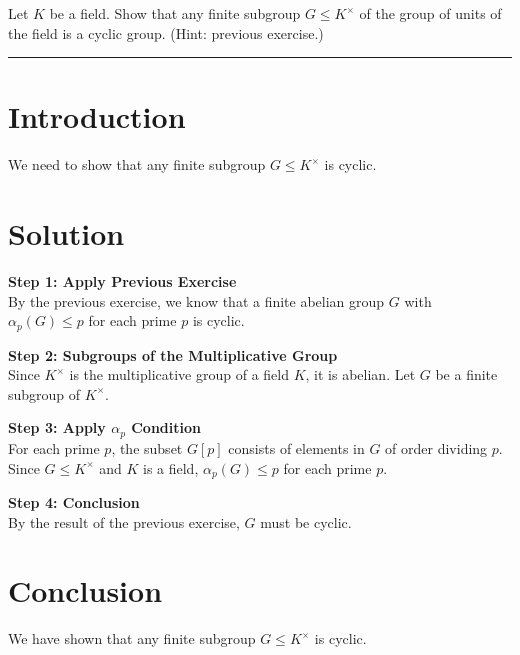 \documentclass[12pt]{amsart}
\theoremstyle{definition}
\numberwithin{equation}{section}
\begin{document}
\newpage
\begin{exercise}{7} Let \(K\) be a field. Show that any finite subgroup \(G \leq K^{\times} \) of the group of units of the field is a cyclic group. (Hint: previous exercise.)

    \noindent\rule{\linewidth}{1pt}

    \section*{Introduction}
    We need to show that any finite subgroup \(G \leq K^{\times}\) is cyclic.

    \section*{Solution}
    \noindent \textbf{Step 1: Apply Previous Exercise}\\
    By the previous exercise, we know that a finite abelian group \(G\) with \(\alpha_p(G) \leq p\) for each prime \(p\) is cyclic.

    \noindent \textbf{Step 2: Subgroups of the Multiplicative Group}\\
    Since \(K^{\times}\) is the multiplicative group of a field \(K\), it is abelian. Let \(G\) be a finite subgroup of \(K^{\times}\).

    \noindent \textbf{Step 3: Apply \(\alpha_p\) Condition}\\
    For each prime \(p\), the subset \(G[p]\) consists of elements in \(G\) of order dividing \(p\). Since \(G \leq K^{\times}\) and \(K\) is a field, \(\alpha_p(G) \leq p\) for each prime \(p\).

    \noindent \textbf{Step 4: Conclusion}\\
    By the result of the previous exercise, \(G\) must be cyclic.

    \section*{Conclusion}
    We have shown that any finite subgroup \(G \leq K^{\times}\) is cyclic.

\end{exercise}
\newpage
\end{document}
